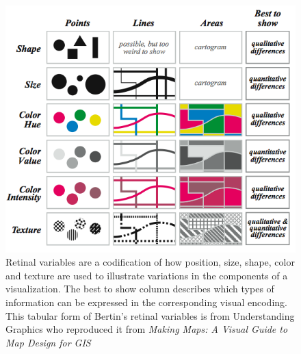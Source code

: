\documentclass[../main.tex]{subfiles}
\begin{document}
\begin{figure}[H]
\includegraphics[width=1\textwidth]{figures/intro/retinal_variables.png}
\caption{Retinal variables are a codification of how position, size, shape, color and texture are used to illustrate variations in the components of a visualization. The best to show column describes which types of information can be expressed in the corresponding visual encoding. This tabular form of Bertin's retinal variables is from Understanding Graphics \cite{malamedInformationDisplayTips2010} who reproduced it from \textit{Making Maps: A Visual Guide to Map Design for GIS} 
\cite{krygierMakingMapsVisual2005}}
\label{fig:intro_retinal_variables}
\end{figure}
\end{document}
